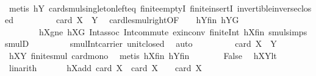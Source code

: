 \begin{isabellebody}
\ \ \ \ \ \ \isamarkupfalse%
\ {\isacharparenleft}{\kern0pt}metis\ hY{}\ card{\isacharunderscore}{\kern0pt}smul{\isacharunderscore}{\kern0pt}singleton{\isacharunderscore}{\kern0pt}left{\isacharunderscore}{\kern0pt}eq\ finite{\isachardot}{\kern0pt}emptyI\ finite{\isachardot}{\kern0pt}insertI\ invertible{\isacharunderscore}{\kern0pt}inverse{\isacharunderscore}{\kern0pt}closed{\isacharparenright}{\kern0pt}\isanewline
\ \ \ \ \isamarkupfalse%
\ \isamarkupfalse%
\ {\isachardoublequoteopen}{\isachardot}{\kern0pt}{\isachardot}{\kern0pt}{\isachardot}{\kern0pt}\ {\isasymle}\ card\ {\isacharparenleft}{\kern0pt}{\isacharquery}{\kern0pt}X{}\ {\isasymcdots}\ {\isacharquery}{\kern0pt}Y{}{\isacharparenright}{\kern0pt}{\isachardoublequoteclose}\ \isamarkupfalse%
\ card{\isacharunderscore}{\kern0pt}le{\isacharunderscore}{\kern0pt}smul{\isacharunderscore}{\kern0pt}right{\isacharbrackleft}{\kern0pt}OF\ {\isacharunderscore}{\kern0pt}\ {\isacharunderscore}{\kern0pt}\ {\isacharunderscore}{\kern0pt}\ hY{}fin\ hY{}G{\isacharbrackright}{\kern0pt}\ \isanewline
\ \ \ \ \ \ \ \ hXgne\ hXG\ Int{\isacharunderscore}{\kern0pt}assoc\ Int{\isacharunderscore}{\kern0pt}commute\ ex{\isacharunderscore}{\kern0pt}in{\isacharunderscore}{\kern0pt}conv\ finite{\isacharunderscore}{\kern0pt}Int\ hXfin\ smul{\isachardot}{\kern0pt}simps\ smul{\isacharunderscore}{\kern0pt}D{\isacharparenleft}{\kern0pt}{}{\isacharparenright}{\kern0pt}\ \isanewline
\ \ \ \ \ \ \ \ smul{\isacharunderscore}{\kern0pt}Int{\isacharunderscore}{\kern0pt}carrier\ unit{\isacharunderscore}{\kern0pt}closed\ \isamarkupfalse%
\ auto\isanewline
\ \ \ \ \isamarkupfalse%
\ \isamarkupfalse%
\ {\isachardoublequoteopen}{\isachardot}{\kern0pt}{\isachardot}{\kern0pt}{\isachardot}{\kern0pt}\ {\isasymle}\ card\ {\isacharparenleft}{\kern0pt}X\ {\isasymcdots}\ Y{\isacharparenright}{\kern0pt}{\isachardoublequoteclose}\ \isamarkupfalse%
\ hXY{}\ finite{\isacharunderscore}{\kern0pt}smul\ card{\isacharunderscore}{\kern0pt}mono\ \isamarkupfalse%
\ {\isacharparenleft}{\kern0pt}metis\ hXfin\ hYfin{\isacharparenright}{\kern0pt}\isanewline
\ \ \ \ \isamarkupfalse%
\ \isamarkupfalse%
\ False\ \isamarkupfalse%
\ hXYlt\ \isamarkupfalse%
\ linarith\isanewline
\ \ \isamarkupfalse%
\isanewline
\ \ \isamarkupfalse%
\ hXadd{\isacharcolon}{\kern0pt}\ {\isachardoublequoteopen}card\ {\isacharquery}{\kern0pt}X{}\ {\isacharplus}{\kern0pt}\ card\ {\isacharquery}{\kern0pt}X{}\ {\isacharequal}{\kern0pt}\ {}\ {\isacharasterisk}{\kern0pt}\ card\ X{\isachardoublequoteclose}\ \isanewline

\end{isabellebody}
